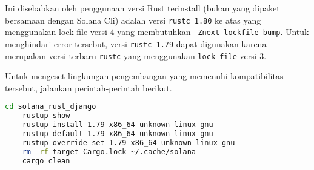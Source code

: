 Ini disebabkan oleh penggunaan versi Rust terinstall (bukan yang dipaket bersamaan dengan Solana Cli) adalah versi \texttt{rustc 1.80} ke atas yang menggunakan lock file versi 4 yang membutuhkan \texttt{-Znext-lockfile-bump}. Untuk menghindari error tersebut, versi \texttt{rustc 1.79} dapat digunakan karena merupakan versi terbaru \texttt{rustc} yang menggunakan \texttt{lock file} versi 3.

Untuk mengeset lingkungan pengembangan yang memenuhi kompatibilitas tersebut, jalankan perintah-perintah berikut.

\begin{lstlisting}[language=bash]
	cd solana_rust_django
	rustup show
	rustup install 1.79-x86_64-unknown-linux-gnu
	rustup default 1.79-x86_64-unknown-linux-gnu
	rustup override set 1.79-x86_64-unknown-linux-gnu
	rm -rf target Cargo.lock ~/.cache/solana
	cargo clean
\end{lstlisting}

